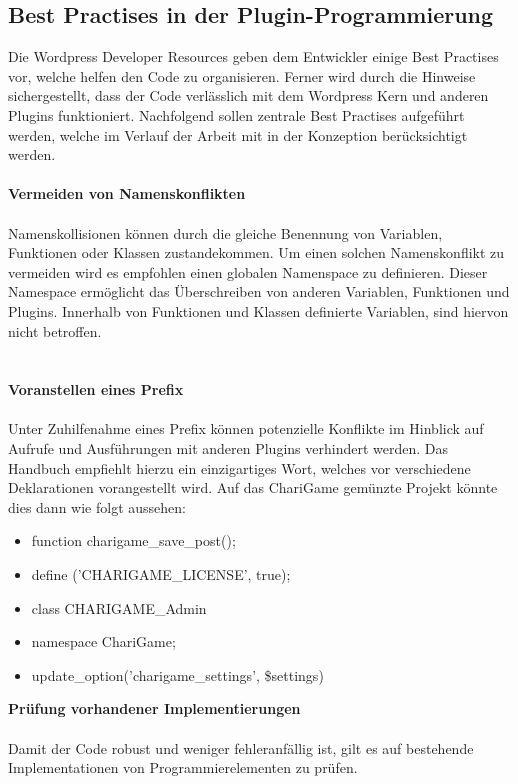 \subsection{Best Practises in der Plugin-Programmierung}
Die Wordpress Developer Resources geben dem Entwickler einige Best Practises vor, welche helfen den Code zu organisieren.
Ferner wird durch die Hinweise sichergestellt, dass der Code verlässlich mit dem Wordpress Kern und anderen Plugins funktioniert.
Nachfolgend sollen zentrale Best Practises aufgeführt werden, welche im Verlauf der Arbeit mit in der Konzeption berücksichtigt werden.
\\
\\
\textbf{Vermeiden von Namenskonflikten}\\\\
Namenskollisionen können durch die gleiche Benennung von Variablen, Funktionen oder Klassen zustandekommen.
Um einen solchen Namenskonflikt zu vermeiden wird es empfohlen einen globalen Namenspace zu definieren.
Dieser Namespace ermöglicht das Überschreiben von anderen Variablen, Funktionen und Plugins.
Innerhalb von Funktionen und Klassen definierte Variablen, sind hiervon nicht betroffen.
\\
\\
\\
\textbf{Voranstellen eines Prefix}\\\\
Unter Zuhilfenahme eines Prefix können potenzielle Konflikte im Hinblick auf Aufrufe und Ausführungen mit anderen Plugins verhindert werden.
Das Handbuch empfiehlt hierzu ein einzigartiges Wort, welches vor verschiedene Deklarationen vorangestellt wird.
Auf das ChariGame gemünzte Projekt könnte dies dann wie folgt aussehen:
\begin{itemize}
 \item function charigame\_save\_post();
 \item define ('CHARIGAME\_LICENSE', true);
 \item class CHARIGAME\_Admin{}
 \item namespace ChariGame;
 \item update\_option('charigame\_settings', \$settings)
\end{itemize}
\vspace{1em}
\textbf{Prüfung vorhandener Implementierungen}\\\\
Damit der Code robust und weniger fehleranfällig ist, gilt es auf bestehende Implementationen von Programmierelementen zu prüfen.
